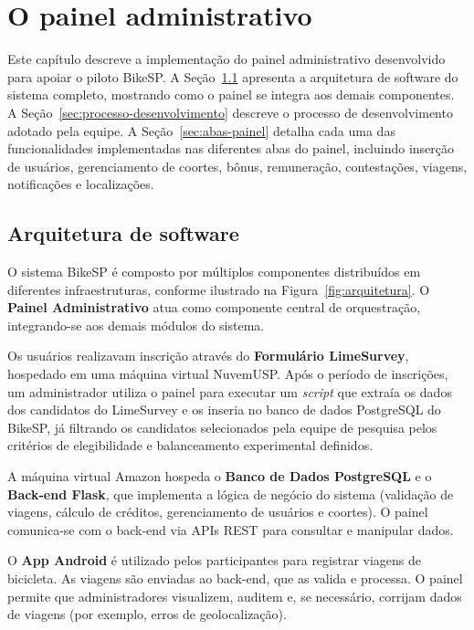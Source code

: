 
\chapter{O painel administrativo}
\label{cap:implementacao}

Este capítulo descreve a implementação do painel administrativo desenvolvido para apoiar o piloto BikeSP. A Seção~\ref{sec:arquitetura} apresenta a arquitetura de software do sistema completo, mostrando como o painel se integra aos demais componentes. A Seção~\ref{sec:processo-desenvolvimento} descreve o processo de desenvolvimento adotado pela equipe. A Seção~\ref{sec:abas-painel} detalha cada uma das funcionalidades implementadas nas diferentes abas do painel, incluindo inserção de usuários, gerenciamento de coortes, bônus, remuneração, contestações, viagens, notificações e localizações.

\section{Arquitetura de software}
\label{sec:arquitetura}
O sistema BikeSP é composto por múltiplos componentes distribuídos em diferentes
infraestruturas, conforme ilustrado na Figura~\ref{fig:arquitetura}. O
\textbf{Painel Administrativo} atua como componente central de orquestração,
integrando-se aos demais módulos do sistema.

Os usuários realizavam inscrição através do \textbf{Formulário LimeSurvey}, hospedado em uma máquina virtual NuvemUSP. Após
o período de inscrições, um administrador utiliza o painel para executar um
\emph{script} que extraía os dados dos candidatos do LimeSurvey e os inseria no
banco de dados PostgreSQL do BikeSP, já filtrando os candidatos selecionados pela 
equipe de pesquisa pelos critérios de elegibilidade e balanceamento experimental definidos.

A máquina virtual Amazon hospeda o
\textbf{Banco de Dados PostgreSQL} e o \textbf{Back-end Flask}, que implementa a
lógica de negócio do sistema (validação de viagens, cálculo de créditos,
gerenciamento de usuários e coortes). O painel comunica-se com o back-end via
APIs REST para consultar e manipular dados.

O \textbf{App Android} é utilizado pelos participantes
para registrar viagens de bicicleta. As viagens são enviadas ao back-end, que as
valida e processa. O painel permite que administradores visualizem, auditem e, se
necessário, corrijam dados de viagens (por exemplo, erros de geolocalização).

